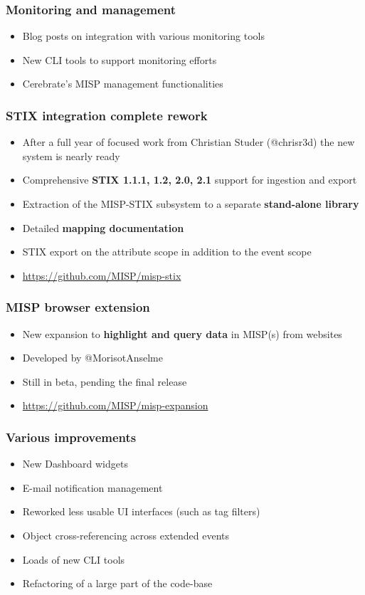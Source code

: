 \begin{frame}
\frametitle{Monitoring and management}
\begin{itemize}
	\item Blog posts on integration with various monitoring tools
        \item New CLI tools to support monitoring efforts
        \item Cerebrate's MISP management functionalities
\end{itemize}
\end{frame}

\begin{frame}
\frametitle{STIX integration complete rework}
\begin{itemize}
	\item After a full year of focused work from Christian Studer (@chrisr3d) the new system is nearly ready
        \item Comprehensive {\bf STIX 1.1.1, 1.2, 2.0, 2.1} support for ingestion and export
        \item Extraction of the MISP-STIX subsystem to a separate {\bf stand-alone library}
        \item Detailed {\bf mapping documentation}
        \item STIX export on the attribute scope in addition to the event scope
        \item \url{https://github.com/MISP/misp-stix}
\end{itemize}
\end{frame}

\begin{frame}
\frametitle{MISP browser extension}
\begin{itemize}
        \item New expansion to {\bf highlight and query data} in MISP(s) from websites
        \item Developed by @MorisotAnselme
	\item Still in beta, pending the final release
        \item \url{https://github.com/MISP/misp-expansion}
\end{itemize}
\end{frame}

\begin{frame}
\frametitle{Various improvements}
\begin{itemize}
	\item New Dashboard widgets
        \item E-mail notification management
        \item Reworked less usable UI interfaces (such as tag filters)
        \item Object cross-referencing across extended events
        \item Loads of new CLI tools
        \item Refactoring of a large part of the code-base
\end{itemize}
\end{frame}


